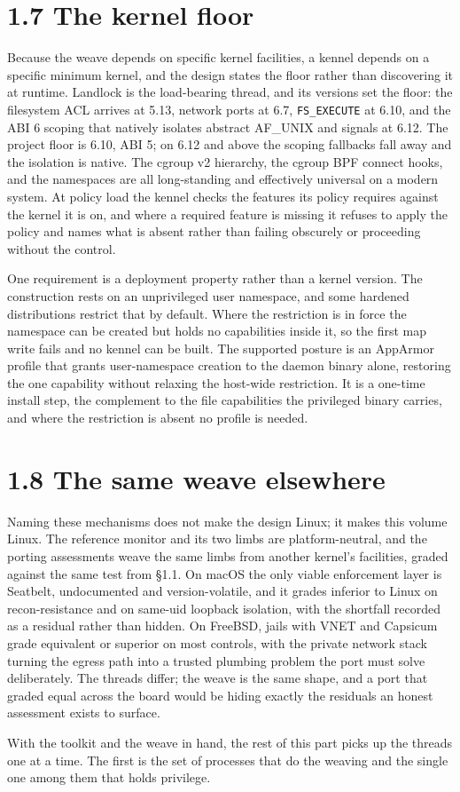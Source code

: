 \hypertarget{the-kernel-floor}{%
\section{1.7 The kernel floor}\label{the-kernel-floor}}

Because the weave depends on specific kernel facilities, a kennel
depends on a specific minimum kernel, and the design states the floor
rather than discovering it at runtime. Landlock is the load-bearing
thread, and its versions set the floor: the filesystem ACL arrives at
5.13, network ports at 6.7, \texttt{FS\_EXECUTE} at 6.10, and the ABI 6
scoping that natively isolates abstract AF\_UNIX and signals at 6.12.
The project floor is 6.10, ABI 5; on 6.12 and above the scoping
fallbacks fall away and the isolation is native. The cgroup v2
hierarchy, the cgroup BPF connect hooks, and the namespaces are all
long-standing and effectively universal on a modern system. At policy
load the kennel checks the features its policy requires against the
kernel it is on, and where a required feature is missing it refuses to
apply the policy and names what is absent rather than failing obscurely
or proceeding without the control.

One requirement is a deployment property rather than a kernel version.
The construction rests on an unprivileged user namespace, and some
hardened distributions restrict that by default. Where the restriction
is in force the namespace can be created but holds no capabilities
inside it, so the first map write fails and no kennel can be built. The
supported posture is an AppArmor profile that grants user-namespace
creation to the daemon binary alone, restoring the one capability
without relaxing the host-wide restriction. It is a one-time install
step, the complement to the file capabilities the privileged binary
carries, and where the restriction is absent no profile is needed.

\hypertarget{the-same-weave-elsewhere}{%
\section{1.8 The same weave elsewhere}\label{the-same-weave-elsewhere}}

Naming these mechanisms does not make the design Linux; it makes this
volume Linux. The reference monitor and its two limbs are
platform-neutral, and the porting assessments weave the same limbs from
another kernel's facilities, graded against the same test from §1.1. On
macOS the only viable enforcement layer is Seatbelt, undocumented and
version-volatile, and it grades inferior to Linux on recon-resistance
and on same-uid loopback isolation, with the shortfall recorded as a
residual rather than hidden. On FreeBSD, jails with VNET and Capsicum
grade equivalent or superior on most controls, with the private network
stack turning the egress path into a trusted plumbing problem the port
must solve deliberately. The threads differ; the weave is the same
shape, and a port that graded equal across the board would be hiding
exactly the residuals an honest assessment exists to surface.

With the toolkit and the weave in hand, the rest of this part picks up
the threads one at a time. The first is the set of processes that do the
weaving and the single one among them that holds privilege.
